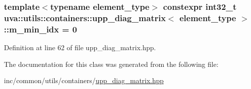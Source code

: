 \hypertarget{classuva_1_1utils_1_1containers_1_1upp__diag__matrix_a5ec8fd06a3b9cd57657a6cb0b651196c}{}
\subsubsection[{m\+\_\+min\+\_\+idx}]{\setlength{\rightskip}{0pt plus 5cm}template$<$typename element\+\_\+type$>$ constexpr int32\+\_\+t {\bf uva\+::utils\+::containers\+::upp\+\_\+diag\+\_\+matrix}$<$ element\+\_\+type $>$\+::m\+\_\+min\+\_\+idx = 0\hspace{0.3cm}{\ttfamily [static]}}\label{classuva_1_1utils_1_1containers_1_1upp__diag__matrix_a5ec8fd06a3b9cd57657a6cb0b651196c}


Definition at line 62 of file upp\+\_\+diag\+\_\+matrix.\+hpp.



The documentation for this class was generated from the following file\+:\begin{DoxyCompactItemize}
\item 
inc/common/utils/containers/\hyperlink{upp__diag__matrix_8hpp}{upp\+\_\+diag\+\_\+matrix.\+hpp}\end{DoxyCompactItemize}

